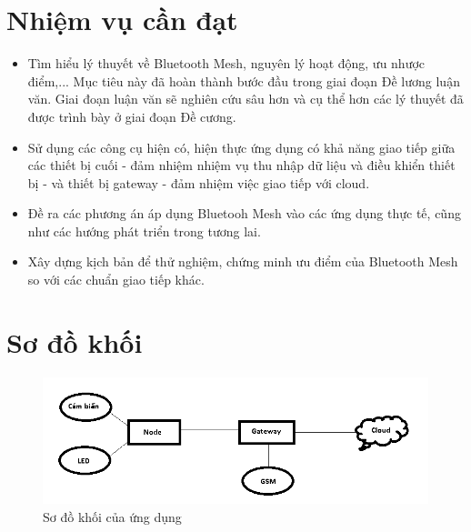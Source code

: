     \section{Nhiệm vụ cần đạt}
    \begin{itemize}
        \item Tìm hiểu lý thuyết về Bluetooth Mesh, nguyên lý hoạt động, ưu nhược điểm,... Mục tiêu này đã hoàn thành bước đầu trong giai đoạn Đề lương luận văn. Giai đoạn luận văn sẽ nghiên cứu sâu hơn và cụ thể hơn các lý thuyết đã được trình bày ở giai đoạn Đề cương.
        \item Sử dụng các công cụ hiện có, hiện thực ứng dụng có khả năng giao tiếp giữa các thiết bị cuối - đảm nhiệm nhiệm vụ thu nhập dữ liệu và điều khiển thiết bị - và thiết bị gateway - đảm nhiệm việc giao tiếp với cloud.
        \item Đề ra các phương án áp dụng Bluetooh Mesh vào các ứng dụng thực tế, cũng như các hướng phát triển trong tương lai.
        \item Xây dựng kịch bản để thử nghiệm, chứng minh ưu điểm của Bluetooth Mesh so với các chuẩn giao tiếp khác.
    \end{itemize}
    \newpage
    \section{Sơ đồ khối}

    \begin{figure}[h!]
    	\begin{center}
    		\includegraphics[scale=0.8]{images/block-diagram.png}
    		\caption{Sơ đồ khối của ứng dụng}
    	\end{center}
    \end{figure}

